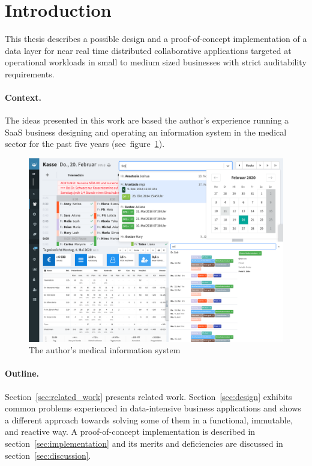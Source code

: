 \section{Introduction}

This thesis describes a possible design and a proof-of-concept implementation of a data layer for near real time distributed collaborative applications targeted at operational workloads in small to medium sized businesses with strict auditability requirements.

\paragraph{Context.} The ideas presented in this work are based the author's experience running a \gls{SaaS} business designing and operating an information system in the medical sector for the past five years (see~figure~\ref{fig:rosalind}).


\begin{figure}[!ht]
  \includegraphics[width=\linewidth]{images/rosalind.png}
  \caption{The author's medical information system}
  \label{fig:rosalind}
\end{figure}

\paragraph{Outline.} Section~\ref{sec:related_work} presents related work. Section~\ref{sec:design} exhibits common problems experienced in data-intensive business applications and shows a different approach towards solving some of them in a functional, immutable, and reactive way. A proof-of-concept implementation is described in section~\ref{sec:implementation} and its merits and deficiencies are discussed in section~\ref{sec:discussion}.

